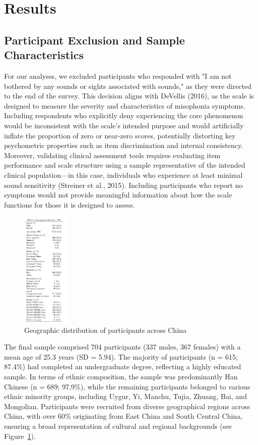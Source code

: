 \section{Results}

\subsection{Participant Exclusion and Sample Characteristics}
For our analyses, we excluded participants who responded with "I am not bothered by any sounds or sights associated with sounds," as they were directed to the end of the survey. This decision aligns with DeVellis (2016), as the scale is designed to measure the severity and characteristics of misophonia symptoms. Including respondents who explicitly deny experiencing the core phenomenon would be inconsistent with the scale's intended purpose and would artificially inflate the proportion of zero or near-zero scores, potentially distorting key psychometric properties such as item discrimination and internal consistency. Moreover, validating clinical assessment tools requires evaluating item performance and scale structure using a sample representative of the intended clinical population—in this case, individuals who experience at least minimal sound sensitivity (Streiner et al., 2015). Including participants who report no symptoms would not provide meaningful information about how the scale functions for those it is designed to assess.

\begin{figure}     
    \centering       
    \includegraphics[width=0.2\textwidth]{Picture1.png}
    \caption{Geographic distribution of participants across China}
    \label{fig:latbrain}
\end{figure}

The final sample comprised 704 participants (337 males, 367 females) with a mean age of 25.3 years (SD = 5.94). The majority of participants (n = 615; 87.4\%) had completed an undergraduate degree, reflecting a highly educated sample. In terms of ethnic composition, the sample was predominantly Han Chinese (n = 689; 97.9\%), while the remaining participants belonged to various ethnic minority groups, including Uygur, Yi, Manchu, Tujia, Zhuang, Bai, and Mongolian. Participants were recruited from diverse geographical regions across China, with over 60\% originating from East China and South Central China, ensuring a broad representation of cultural and regional backgrounds (see Figure~\ref{fig:latbrain}).

